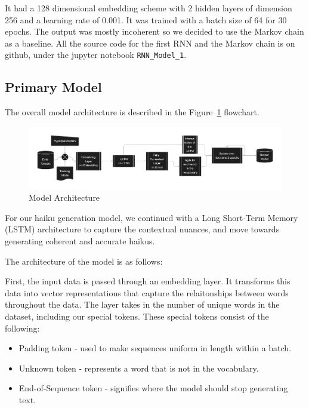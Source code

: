 \documentclass{article} %
\begin{document}
It had a 128 dimensional embedding scheme with 2 hidden layers of dimension 256 and a learning rate of 0.001. It was trained with a batch size of 64
for 30 epochs. The output was mostly incoherent so we decided to use the Markov chain as a baseline. All the source code for the first RNN and the
Markov chain is on github, under the jupyter notebook \texttt{RNN\_Model\_1}.



\subsection{Primary Model}

The overall model architecture is described in the Figure~\ref{fig:flowchart} flowchart.

\begin{figure}[h]
  \begin{center}
  \includegraphics[width=1\textwidth]{Figs/HaikuLSTMArch.png}
  \end{center}
  \caption{Model Architecture}
  \label{fig:flowchart}
\end{figure}

For our haiku generation model, we continued with a Long Short-Term Memory (LSTM) architecture to capture the contextual nuances, and move towards generating coherent and accurate haikus.

The architecture of the model is as follows:

First, the input data is passed through an embedding layer.
It transforms this data into vector representations that capture the
relaitonships between words throughout the data.
The layer takes in the number of unique words in the dataset,
including our special tokens.
These special tokens consist of the following:
\begin{itemize}
  \item Padding token - used to make sequences uniform in length within a batch.
  \item Unknown token - represents a word that is not in the vocabulary.
  \item End-of-Sequence token - signifies where the model should stop generating text.
\end{itemize}
\end{document}
